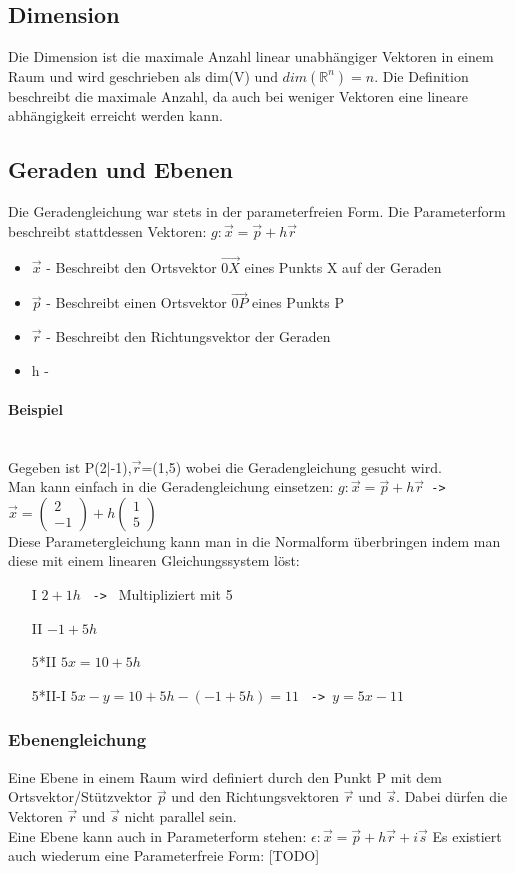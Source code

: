 \documentclass{article}
\newcommand{\paragraphlb}[1]{\paragraph{#1}\mbox{}\\}
\newcommand{\R}{\mathbb{R}}
\begin{document}
	\subsection{Dimension}
	Die Dimension ist die maximale Anzahl linear unabhängiger Vektoren in einem Raum und wird geschrieben als dim(V) und $dim(\R^n)=n$. Die Definition beschreibt die maximale Anzahl, da auch bei weniger Vektoren eine lineare abhängigkeit erreicht werden kann.
	\subsection{Geraden und Ebenen}
	Die Geradengleichung war stets in der parameterfreien Form. Die Parameterform beschreibt stattdessen Vektoren: $g:\vec{x}=\vec{p}+h \vec{r}$
	\begin{itemize}
		\item{$\vec{x}$ - Beschreibt den Ortsvektor $\overrightarrow{0X}$ eines Punkts X auf der Geraden}
		\item{$\vec{p}$ - Beschreibt einen Ortsvektor $\overrightarrow{0P}$ eines Punkts P}
		\item{$\vec{r}$ - Beschreibt den Richtungsvektor der Geraden}
		\item{h - }
	\end{itemize}
	\paragraphlb{Beispiel}
	Gegeben ist P(2|-1),$\vec{r}$=(1,5) wobei die Geradengleichung gesucht wird. \\
	Man kann einfach in die Geradengleichung einsetzen: $g:\vec{x}=\vec{p}+h \vec{r}$\texttt{ -> }$\vec{x}=\begin{pmatrix} 2 \\ -1 \end{pmatrix}+h \begin{pmatrix} 1 \\ 5 \end{pmatrix}$ \\
	Diese Parametergleichung kann man in die Normalform überbringen indem man diese mit einem linearen Gleichungssystem löst: \\
	\begin{itemize}
		\item[I]{$2+1h$ \texttt{ -> } Multipliziert mit 5}
		\item[II]{$-1+5h$}
		\item[5*II]{$5x=10+5h$}
		\item[5*II-I]{$5x-y=10+5h-(-1+5h)=11$ \texttt{ -> }$y=5x-11$}
	\end{itemize}
	\subsubsection{Ebenengleichung}
	Eine Ebene in einem Raum wird definiert durch den Punkt P mit dem Ortsvektor/Stützvektor $\vec{p}$ und den Richtungsvektoren $\vec{r}$ und $\vec{s}$. Dabei dürfen die Vektoren $\vec{r}$ und $\vec{s}$ nicht parallel sein. \\
	Eine Ebene kann auch in Parameterform stehen: $\epsilon:\vec{x}=\vec{p}+h \vec{r}+i \vec{s}$
	Es existiert auch wiederum eine Parameterfreie Form: [TODO] \\
\end{document}
